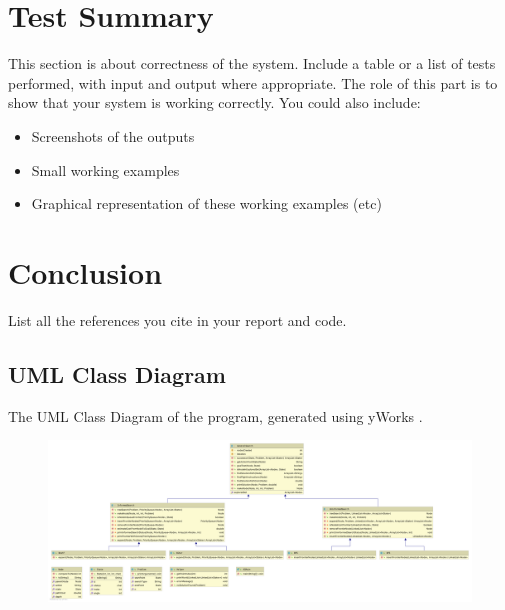 \documentclass[letterpaper,12pt]{article}
\begin{document}
\section{Test Summary}
\label{sec:test-summary}

This section is about correctness of the system. Include a table or a list of tests performed, with input and output where appropriate. The role of this part is to show that your system is working correctly. You could also include:

\begin{itemize}
    \item Screenshots of the outputs
    \item Small working examples
    \item Graphical representation of these working examples (etc)
\end{itemize}


\section{Conclusion}
\label{sec:conclusion}

List all the references you cite in your report and code.


\newpage
\begin{appendices}

\section{UML Class Diagram}
\label{sec:uml_class_diagram}

The UML Class Diagram of the program, generated using yWorks \cite{yworks}.

\begin{figure}
\centering
\includegraphics[width=\textwidth]{UML/UML_class_diagram.png}
{\label{fig:uml_class_diagram}}
\end{figure}

\newpage



\end{appendices}
\end{document}
